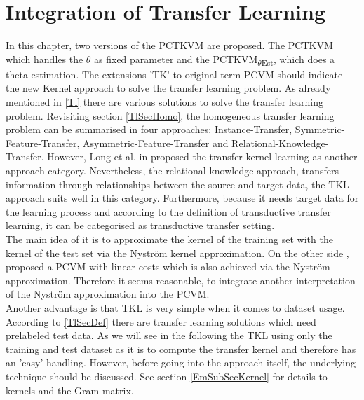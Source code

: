 \chapter{Integration of Transfer Learning}\label{In}
In this chapter, two versions of the \ac{PCTKVM} are proposed.
The \acs{PCTKVM} which handles the $\theta$ as fixed parameter and the \acs{PCTKVM}\textsubscript{$\theta$Est}, which does a theta estimation.
The extensions 'TK' to original term \acs{PCVM} should indicate the new Kernel approach to solve the transfer learning problem.
As already mentioned in \ref{Tl} there are various solutions to solve the transfer learning problem.
Revisiting section \ref{TlSecHomo}, the homogeneous transfer learning problem can be summarised in four approaches: Instance-Transfer, Symmetric-Feature-Transfer, Asymmetric-Feature-Transfer and Relational-Knowledge-Transfer.\newline
However, Long et al. in \cite{Long.2015} proposed the transfer kernel learning as another approach-category.
Nevertheless, the relational knowledge approach, transfers information through relationships between the source and target data, the \acs{TKL} approach suits well in this category.
Furthermore, because it needs target data for the learning process and according to the definition of transductive transfer learning, it can be categorised as transductive transfer setting.\\
The main idea of it is to approximate the kernel of the training set with the kernel of the test set via the Nyström kernel approximation.\cite{Long.2015}
On the other side \cite{Schleif.2015}, proposed a \acs{PCVM} with linear costs which is also achieved via the Nyström approximation.
Therefore it seems reasonable, to integrate another interpretation of the Nyström approximation into the \acs{PCVM}.\\
Another advantage is that \acs{TKL} is very simple when it comes to dataset usage.
According to \ref{TlSecDef} there are transfer learning solutions which need prelabeled test data.
As we will see in the following the \acs{TKL} using only the training and test dataset as it is to compute the transfer kernel and therefore has an 'easy' handling.\newline
However, before going into the approach itself, the underlying technique should be discussed.
See section \ref{EmSubSecKernel} for details to kernels and the Gram matrix.
